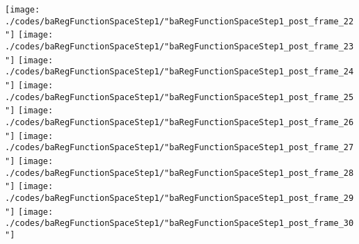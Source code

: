 \begin{frame}{\insertsection}
\begin{center}
{\begin{animateinline}{20}
				 \texttt{[image: ./codes/baRegFunctionSpaceStep1/"baRegFunctionSpaceStep1\_post\_frame\_22"]}\newframe
				 \texttt{[image: ./codes/baRegFunctionSpaceStep1/"baRegFunctionSpaceStep1\_post\_frame\_23"]}\newframe
				 \texttt{[image: ./codes/baRegFunctionSpaceStep1/"baRegFunctionSpaceStep1\_post\_frame\_24"]}\newframe
				 \texttt{[image: ./codes/baRegFunctionSpaceStep1/"baRegFunctionSpaceStep1\_post\_frame\_25"]}\newframe
				 \texttt{[image: ./codes/baRegFunctionSpaceStep1/"baRegFunctionSpaceStep1\_post\_frame\_26"]}\newframe
				 \texttt{[image: ./codes/baRegFunctionSpaceStep1/"baRegFunctionSpaceStep1\_post\_frame\_27"]}\newframe
				 \texttt{[image: ./codes/baRegFunctionSpaceStep1/"baRegFunctionSpaceStep1\_post\_frame\_28"]}\newframe
				 \texttt{[image: ./codes/baRegFunctionSpaceStep1/"baRegFunctionSpaceStep1\_post\_frame\_29"]}\newframe
				 \texttt{[image: ./codes/baRegFunctionSpaceStep1/"baRegFunctionSpaceStep1\_post\_frame\_30"]}
			 \end{animateinline}
			}
	\end{center}
    
\end{frame}


